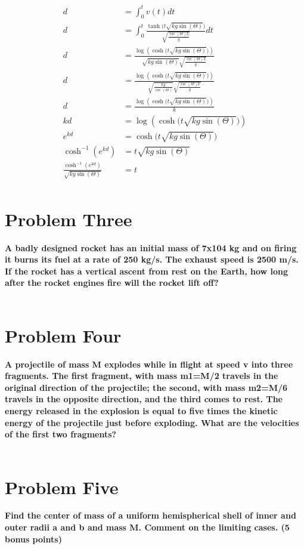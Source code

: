 \documentclass[10pt]{article} %
\begin{document}
\begin{align*}
  d &= \int_0^t v(t) dt\\
  d &= \int_0^t \frac{\tanh\Big(t\sqrt{kg\sin(\Theta)}\Big)}{\sqrt{\frac{\csc(\Theta)k}{g}}} dt\\
  d &= \frac{\log(\cosh\Big(t\sqrt{kg\sin(\Theta)}\Big))}{\sqrt{kg\sin(\Theta)}\sqrt{\frac{\csc(\Theta)k}{g}}}\\
  d &= \frac{\log(\cosh\Big(t\sqrt{kg\sin(\Theta)}\Big))}{\sqrt{\frac{kg}{\csc(\Theta)}}\sqrt{\frac{\csc(\Theta)k}{g}}}\\
 d &= \frac{\log(\cosh\Big(t\sqrt{kg\sin(\Theta)}\Big))}{k}\\    
  kd &= \log(\cosh\Big(t\sqrt{kg\sin(\Theta)}\Big))\\
  e^{kd} &= \cosh\Big(t\sqrt{kg\sin(\Theta)}\Big)\\
  \cosh^{-1}(e^{kd}) &= t\sqrt{kg\sin(\Theta)}\\
  \frac{\cosh^{-1}(e^{kd})}{\sqrt{kg\sin(\Theta)}} &= t\\        
\end{align*}



\vspace{1 cm}

\section{Problem Three}
\textbf{A badly designed rocket has an initial mass of 7x104 kg and on firing it burns its fuel at a rate of 250 kg/s. The exhaust speed is 2500 m/s. If the rocket has a vertical ascent from rest on the Earth, how long after the rocket engines fire will the rocket lift off?} \\ \\
\vspace{1 cm}

\section{Problem Four}
\textbf{A projectile of mass M explodes while in flight at speed v into three fragments. The first fragment, with mass m1=M/2 travels in the original direction of the projectile; the second, with mass m2=M/6 travels in the opposite direction, and the third comes to rest. The energy released in the explosion is equal to five times the kinetic energy of the projectile just before exploding. What are the velocities of the first two fragments?} \\ \\
\vspace{1 cm}

\section{Problem Five}
\textbf{Find the center of mass of a uniform hemispherical shell of inner and outer radii a and b and mass M. Comment on the limiting cases. (5 bonus points)} \\ \\
\vspace{1 cm}
\end{document}
